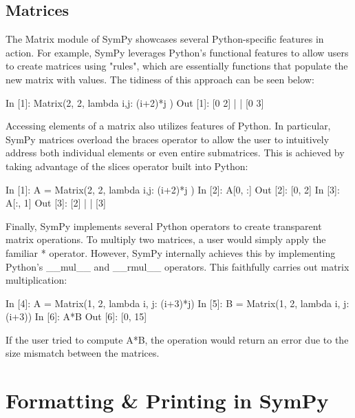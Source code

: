 \documentclass[11pt,a4paper,oneside]{report}
\begin{document}
\subsection*{Matrices}
The Matrix module of SymPy showcases several Python-specific features in action. For example, SymPy leverages Python's functional features to allow users to create matrices using "rules", which are essentially functions that populate the new matrix with values. The tidiness of this approach can be seen below:
\begin{verbatimtab}
        In [1]: Matrix(2, 2, lambda i,j: (i+2)*j )
        Out [1]: 
        [0  2]
        |    |
        [0  3]
\end{verbatimtab}
Accessing elements of a matrix also utilizes features of Python. In particular, SymPy matrices overload the braces operator to allow the user to intuitively address both individual elements or even entire submatrices. This is achieved by taking advantage of the slices operator built into Python:
\begin{verbatimtab}
        In [1]: A = Matrix(2, 2, lambda i,j: (i+2)*j )
        In [2]: A[0, :]
        Out [2]: [0, 2]
        In [3]: A[:, 1]
        Out [3]: 
        [2]
        | |
        [3]
\end{verbatimtab}
Finally, SymPy implements several Python operators to create transparent matrix operations. To multiply two matrices, a user would simply apply the familiar * operator. However, SymPy internally achieves this by implementing Python's \_\_mul\_\_ and \_\_rmul\_\_ operators. This faithfully carries out matrix multiplication:
\begin{verbatimtab}
        In [4]: A = Matrix(1, 2, lambda i, j: (i+3)*j)
        In [5]: B = Matrix(1, 2, lambda i, j: (i+3))
        In [6]: A*B
        Out [6]: [0, 15]
\end{verbatimtab}
If the user tried to compute A*B, the operation would return an error due to the size mismatch between the matrices.
\section*{Formatting \& Printing in SymPy}
\end{document}
